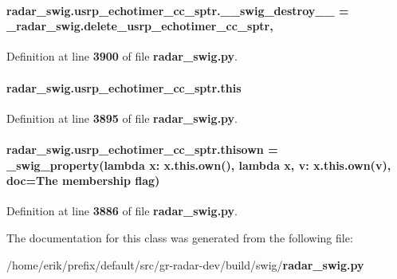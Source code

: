 \paragraph[{\+\_\+\+\_\+swig\+\_\+destroy\+\_\+\+\_\+}]{\setlength{\rightskip}{0pt plus 5cm}radar\+\_\+swig.\+usrp\+\_\+echotimer\+\_\+cc\+\_\+sptr.\+\_\+\+\_\+swig\+\_\+destroy\+\_\+\+\_\+ = \+\_\+radar\+\_\+swig.\+delete\+\_\+usrp\+\_\+echotimer\+\_\+cc\+\_\+sptr\hspace{0.3cm}{\ttfamily [static]}, {\ttfamily [private]}}\label{classradar__swig_1_1usrp__echotimer__cc__sptr_a26c6de23ef2d13d6a8df32d0031cbb5f}


Definition at line {\bf 3900} of file {\bf radar\+\_\+swig.\+py}.

\paragraph[{this}]{\setlength{\rightskip}{0pt plus 5cm}radar\+\_\+swig.\+usrp\+\_\+echotimer\+\_\+cc\+\_\+sptr.\+this}\label{classradar__swig_1_1usrp__echotimer__cc__sptr_adc89fd12ee0436706ce44a3744750946}


Definition at line {\bf 3895} of file {\bf radar\+\_\+swig.\+py}.

\paragraph[{thisown}]{\setlength{\rightskip}{0pt plus 5cm}radar\+\_\+swig.\+usrp\+\_\+echotimer\+\_\+cc\+\_\+sptr.\+thisown = {\bf \+\_\+swig\+\_\+property}(lambda x\+: x.\+this.\+own(), lambda {\bf x}, v\+: x.\+this.\+own(v), doc=\textquotesingle{}The membership flag\textquotesingle{})\hspace{0.3cm}{\ttfamily [static]}}\label{classradar__swig_1_1usrp__echotimer__cc__sptr_ad5ba26bbd69bca9c15efc4cce72e1e67}


Definition at line {\bf 3886} of file {\bf radar\+\_\+swig.\+py}.



The documentation for this class was generated from the following file\+:\begin{DoxyCompactItemize}
\item 
/home/erik/prefix/default/src/gr-\/radar-\/dev/build/swig/{\bf radar\+\_\+swig.\+py}\end{DoxyCompactItemize}
